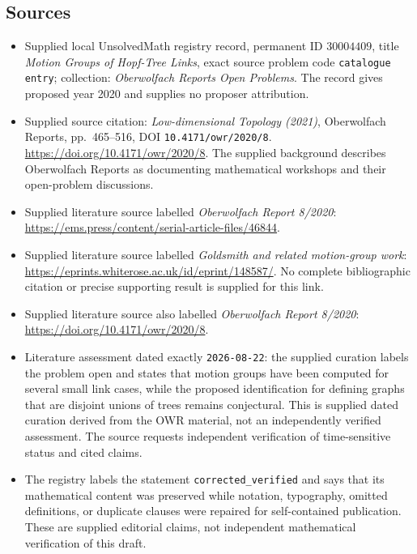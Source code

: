\documentclass[11pt]{article}
\begin{document}
\subsection{Sources}
\begin{itemize}
\item Supplied local UnsolvedMath registry record, permanent ID \(30004409\), title \emph{Motion Groups of Hopf-Tree Links}, exact source problem code \texttt{catalogue entry}; collection: \emph{Oberwolfach Reports Open Problems}. The record gives proposed year 2020 and supplies no proposer attribution.
\item Supplied source citation: \emph{Low-dimensional Topology (2021)}, Oberwolfach Reports, pp.\ 465--516, DOI \texttt{10.4171/owr/2020/8}. \url{https://doi.org/10.4171/owr/2020/8}. The supplied background describes Oberwolfach Reports as documenting mathematical workshops and their open-problem discussions.
\item Supplied literature source labelled \emph{Oberwolfach Report 8/2020}: \url{https://ems.press/content/serial-article-files/46844}.
\item Supplied literature source labelled \emph{Goldsmith and related motion-group work}: \url{https://eprints.whiterose.ac.uk/id/eprint/148587/}. No complete bibliographic citation or precise supporting result is supplied for this link.
\item Supplied literature source also labelled \emph{Oberwolfach Report 8/2020}: \url{https://doi.org/10.4171/owr/2020/8}.
\item Literature assessment dated exactly \texttt{2026-08-22}: the supplied curation labels the problem open and states that motion groups have been computed for several small link cases, while the proposed identification for defining graphs that are disjoint unions of trees remains conjectural. This is supplied dated curation derived from the OWR material, not an independently verified assessment. The source requests independent verification of time-sensitive status and cited claims.
\item The registry labels the statement \texttt{corrected\_verified} and says that its mathematical content was preserved while notation, typography, omitted definitions, or duplicate clauses were repaired for self-contained publication. These are supplied editorial claims, not independent mathematical verification of this draft.
\end{itemize}
\end{document}
